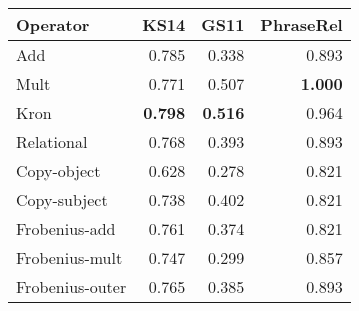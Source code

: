 \begin{tabular}{lrrr}
\toprule
Operator &   KS14 &   GS11 &  PhraseRel \\
\midrule
Add              &  0.785 &  0.338 &      0.893 \\
Mult             &  0.771 &  0.507 &      \textbf{1.000} \\
Kron             &  \textbf{0.798} &  \textbf{0.516} &      0.964 \\
Relational       &  0.768 &  0.393 &      0.893 \\
Copy-object      &  0.628 &  0.278 &      0.821 \\
Copy-subject     &  0.738 &  0.402 &      0.821 \\
Frobenius-add   &  0.761 &  0.374 &      0.821 \\
Frobenius-mult  &  0.747 &  0.299 &      0.857 \\
Frobenius-outer &  0.765 &  0.385 &      0.893 \\
\bottomrule
\end{tabular}
